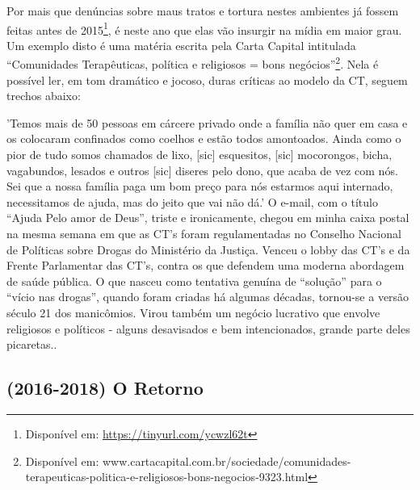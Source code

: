 \documentclass[
	12pt,				%
	oneside,			%
	a4paper,			%
	sumario=tradicional,
	english,			%
	brazil				%
	]{abntex2}
\begin{document}
Por mais que denúncias sobre maus tratos e tortura nestes ambientes já fossem feitas antes de 2015\footnote{Disponível em: \url{https://tinyurl.com/ycwzl62t}}, é neste ano que elas vão insurgir na mídia em maior grau. Um exemplo disto é uma matéria escrita pela Carta Capital intitulada ``Comunidades Terapêuticas, política e religiosos = bons negócios''\footnote{Disponível em: www.cartacapital.com.br/sociedade/comunidades-terapeuticas-politica-e-religiosos-bons-negocios-9323.html}. Nela é possível ler, em tom dramático e jocoso, duras críticas ao modelo da CT, seguem trechos abaixo:
\begin{quoting}[rightmargin=0cm,leftmargin=4cm]
\begin{singlespace}
{\footnotesize
'Temos mais de 50 pessoas em cárcere privado onde a família não quer em casa e os colocaram confinados como coelhos e estão todos amontoados. Ainda como o pior de tudo somos chamados de lixo, [sic] esquesitos, [sic] mocorongos, bicha, vagabundos, lesados e outros [sic] diseres pelo dono, que acaba de vez com nós. Sei que a nossa família paga um bom preço para nós estarmos aqui internado, necessitamos de ajuda, mas do jeito que vai não dá.’
O e-mail, com o título “Ajuda Pelo amor de Deus”, triste e ironicamente, chegou em minha caixa postal na mesma semana em que as CT’s foram regulamentadas no Conselho Nacional de Políticas sobre Drogas do Ministério da Justiça. Venceu o lobby das CT’s e da Frente Parlamentar das CT’s, contra os que defendem uma moderna abordagem de saúde pública.
O que nasceu como tentativa genuína de “solução” para o “vício nas drogas”, quando foram criadas há algumas décadas, tornou-se a versão século 21 dos manicômios. Virou também um negócio lucrativo que envolve religiosos e políticos - alguns desavisados e bem intencionados, grande parte deles picaretas.\cite{carta2015}.}
\end{singlespace}
\end{quoting}
\hypertarget{o-retorno}{%
\subsection{(2016-2018) O Retorno}\label{o-retorno}}
\end{document}

